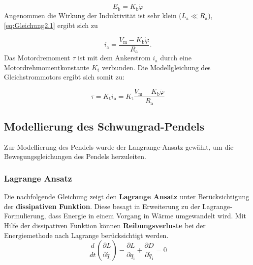 \begin{equation} \label{eq:Gleichung2.2}
    E_{\mathrm{b}} = K_{\mathrm{b}} \dot\varphi
\end{equation}
\newline
Angenommen die Wirkung der Induktivität ist sehr klein ($L_{\mathrm{a}} \ll R_{\mathrm{a}}$), \autoref{eq:Gleichung2.1} ergibt sich zu

\begin{equation} \label{eq:Gleichung2.3}
    i_{\mathrm{a}} = \frac{V_{\mathrm{m}} - K_{\mathrm{b}} \dot\varphi}{R_{\mathrm{a}}}.
\end{equation}
\newline
Das Motordremoment $\tau$ ist mit dem Ankerstrom $i_{\mathrm{a}}$ durch eine Motordrehmomentkonstante $K_{\mathrm{t}}$ verbunden. Die Modellgleichung des Gleichstrommotors ergibt sich somit zu:

\begin{equation} \label{eq:Gleichung2.4}
    \boxed{\tau = K_{\mathrm{t}} i_{\mathrm{a}} = K_{\mathrm{t}} \frac{V_{\mathrm{m}} - K_{\mathrm{b}} \dot\varphi}{R_{\mathrm{a}}}}
\end{equation}

\subsection{Modellierung des Schwungrad-Pendels}

Zur Modellierung des Pendels wurde der Langrange-Ansatz gewählt, um die Bewegungsgleichungen des Pendels herzuleiten.
 
\subsubsection{Lagrange Ansatz}

Die nachfolgende Gleichung zeigt den \textbf{Lagrange Ansatz} unter Berücksichtigung der \textbf{dissipativen Funktion}. Diese besagt in Erweiterung zu der Lagrange-Formulierung, dass Energie in einem Vorgang in Wärme umgewandelt wird. Mit Hilfe der dissipativen Funktion können \textbf{Reibungsverluste} bei der Energiemethode nach Lagrange berücksichtigt werden.
\begin{equation} \label{eq:Gleichung2.5}
    \boxed{\frac{d}{dt} \left(\frac{\partial L}{\partial \dot{q_{\mathrm{i}}}}\right) - \frac{\partial L}{\partial q_{\mathrm{i}}} + \frac{\partial D}{\partial \dot{q_{\mathrm{i}}}} = 0}
\end{equation}


